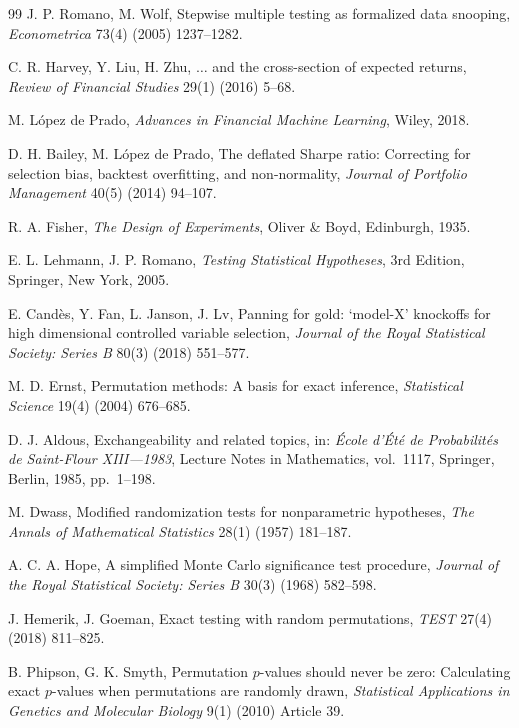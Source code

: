 \documentclass[preprint,12pt]{elsarticle}
\theoremstyle{definition}
\begin{document}
\begin{thebibliography}{99}
J. P. Romano, M. Wolf, Stepwise multiple testing as formalized data snooping,
\emph{Econometrica} 73(4) (2005) 1237--1282.

C. R. Harvey, Y. Liu, H. Zhu, $\ldots$ and the cross-section of expected returns,
\emph{Review of Financial Studies} 29(1) (2016) 5--68.

M. L\'opez de Prado, \emph{Advances in Financial Machine Learning}, Wiley, 2018.

D. H. Bailey, M. L\'opez de Prado, The deflated Sharpe ratio: Correcting for selection bias, backtest overfitting, and non-normality,
\emph{Journal of Portfolio Management} 40(5) (2014) 94--107.

R. A. Fisher, \emph{The Design of Experiments}, Oliver \& Boyd, Edinburgh, 1935.

E. L. Lehmann, J. P. Romano, \emph{Testing Statistical Hypotheses}, 3rd Edition, Springer, New York, 2005.

E. Cand\`es, Y. Fan, L. Janson, J. Lv, Panning for gold: `model-X' knockoffs for high dimensional controlled variable selection,
\emph{Journal of the Royal Statistical Society: Series B} 80(3) (2018) 551--577.

M. D. Ernst, Permutation methods: A basis for exact inference,
\emph{Statistical Science} 19(4) (2004) 676--685.

D. J. Aldous, Exchangeability and related topics, in: \emph{\'Ecole d'\'Et\'e de Probabilit\'es de Saint-Flour XIII---1983}, Lecture Notes in Mathematics, vol.~1117, Springer, Berlin, 1985, pp.~1--198.

M. Dwass, Modified randomization tests for nonparametric hypotheses,
\emph{The Annals of Mathematical Statistics} 28(1) (1957) 181--187.

A. C. A. Hope, A simplified Monte Carlo significance test procedure,
\emph{Journal of the Royal Statistical Society: Series B} 30(3) (1968) 582--598.

J. Hemerik, J. Goeman, Exact testing with random permutations,
\emph{TEST} 27(4) (2018) 811--825.

B. Phipson, G. K. Smyth, Permutation $p$-values should never be zero: Calculating exact $p$-values when permutations are randomly drawn,
\emph{Statistical Applications in Genetics and Molecular Biology} 9(1) (2010) Article 39.


\end{thebibliography}
\end{document}
